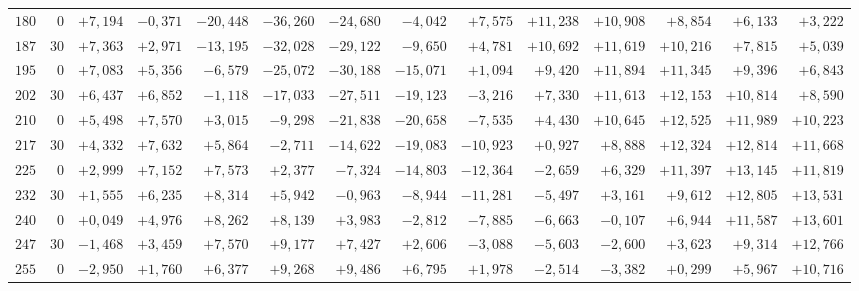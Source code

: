 \begin{landscape}
\begin{longtable}{@{}rr|r|r|r|r|r|r|r|r|r|r|r|r@{}}
\(180\) & \(0\) & \(+7{,}194\) & \(-0{,}371\) & \(-20{,}448\) & \(-36{,}260\) & \(-24{,}680\) & \(-4{,}042\) & \(+7{,}575\) & \(+11{,}238\) & \(+10{,}908\) & \(+8{,}854\) & \(+6{,}133\) & \(+3{,}222\)\\
\(187\) & \(30\) & \(+7{,}363\) & \(+2{,}971\) & \(-13{,}195\) & \(-32{,}028\) & \(-29{,}122\) & \(-9{,}650\) & \(+4{,}781\) & \(+10{,}692\) & \(+11{,}619\) & \(+10{,}216\) & \(+7{,}815\) & \(+5{,}039\)\\
\(195\) & \(0\) & \(+7{,}083\) & \(+5{,}356\) & \(-6{,}579\) & \(-25{,}072\) & \(-30{,}188\) & \(-15{,}071\) & \(+1{,}094\) & \(+9{,}420\) & \(+11{,}894\) & \(+11{,}345\) & \(+9{,}396\) & \(+6{,}843\)\\
\(202\) & \(30\) & \(+6{,}437\) & \(+6{,}852\) & \(-1{,}118\) & \(-17{,}033\) & \(-27{,}511\) & \(-19{,}123\) & \(-3{,}216\) & \(+7{,}330\) & \(+11{,}613\) & \(+12{,}153\) & \(+10{,}814\) & \(+8{,}590\)\\[2pt]
\(210\) & \(0\) & \(+5{,}498\) & \(+7{,}570\) & \(+3{,}015\) & \(-9{,}298\) & \(-21{,}838\) & \(-20{,}658\) & \(-7{,}535\) & \(+4{,}430\) & \(+10{,}645\) & \(+12{,}525\) & \(+11{,}989\) & \(+10{,}223\)\\
\(217\) & \(30\) & \(+4{,}332\) & \(+7{,}632\) & \(+5{,}864\) & \(-2{,}711\) & \(-14{,}622\) & \(-19{,}083\) & \(-10{,}923\) & \(+0{,}927\) & \(+8{,}888\) & \(+12{,}324\) & \(+12{,}814\) & \(+11{,}668\)\\
\(225\) & \(0\) & \(+2{,}999\) & \(+7{,}152\) & \(+7{,}573\) & \(+2{,}377\) & \(-7{,}324\) & \(-14{,}803\) & \(-12{,}364\) & \(-2{,}659\) & \(+6{,}329\) & \(+11{,}397\) & \(+13{,}145\) & \(+11{,}819\)\\
\(232\) & \(30\) & \(+1{,}555\) & \(+6{,}235\) & \(+8{,}314\) & \(+5{,}942\) & \(-0{,}963\) & \(-8{,}944\) & \(-11{,}281\) & \(-5{,}497\) & \(+3{,}161\) & \(+9{,}612\) & \(+12{,}805\) & \(+13{,}531\)\\[2pt]
\(240\) & \(0\) & \(+0{,}049\) & \(+4{,}976\) & \(+8{,}262\) & \(+8{,}139\) & \(+3{,}983\) & \(-2{,}812\) & \(-7{,}885\) & \(-6{,}663\) & \(-0{,}107\) & \(+6{,}944\) & \(+11{,}587\) & \(+13{,}601\)\\
\(247\) & \(30\) & \(-1{,}468\) & \(+3{,}459\) & \(+7{,}570\) & \(+9{,}177\) & \(+7{,}427\) & \(+2{,}606\) & \(-3{,}088\) & \(-5{,}603\) & \(-2{,}600\) & \(+3{,}623\) & \(+9{,}314\) & \(+12{,}766\)\\
\(255\) & \(0\) & \(-2{,}950\) & \(+1{,}760\) & \(+6{,}377\) & \(+9{,}268\) & \(+9{,}486\) & \(+6{,}795\) & \(+1{,}978\) & \(-2{,}514\) & \(-3{,}382\) & \(+0{,}299\) & \(+5{,}967\) & \(+10{,}716\)\\

\end{longtable}
\end{landscape}
